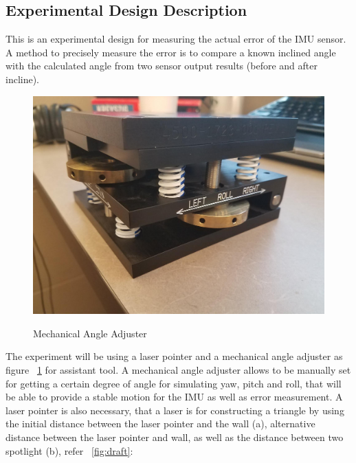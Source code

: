 \subsection{Experimental Design Description}
This is an experimental design for measuring the actual error of the IMU sensor. A method to precisely measure the error is to compare a known inclined angle with the calculated angle from two sensor output results (before and after incline). 

\begin{figure}
	\centering
 		\caption{Mechanical Angle Adjuster}
      	\includegraphics[width=\textwidth,height=\textheight,keepaspectratio]{img/widget}
    \label{fig:widget}
\end{figure}

The experiment will be using a laser pointer and a mechanical angle adjuster as figure ~\ref{fig:widget} for assistant tool. A mechanical angle adjuster allows to be manually set for getting a certain degree of angle for simulating yaw, pitch and roll, that will be able to provide a stable motion for the IMU as well as error measurement. A laser pointer is also necessary, that a laser is for constructing a triangle by using the initial distance between the laser pointer and the wall (a), alternative distance between the laser pointer and wall, as well as the distance between two spotlight (b), refer ~\ref{fig:draft}:

